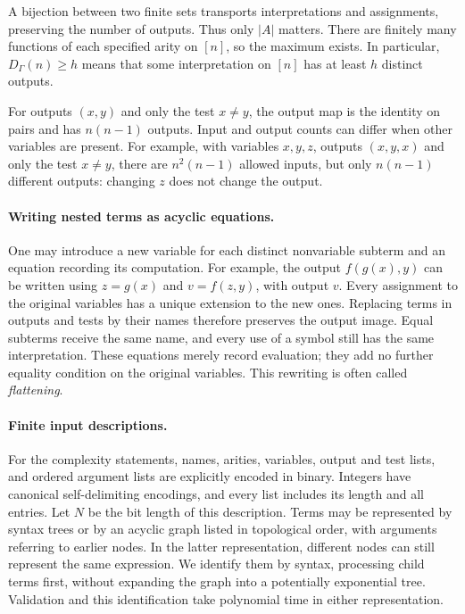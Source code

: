 \documentclass[12pt]{article}
\theoremstyle{definition}
\begin{document}
A bijection between two finite sets transports interpretations and
assignments, preserving the number of outputs. Thus only $|A|$ matters.
There are finitely many functions of each specified arity on $[n]$,
so the maximum exists. In particular, $D_\Gamma(n)\ge h$ means that
some interpretation on $[n]$ has at least $h$ distinct outputs.

For outputs $(x,y)$ and only the test $x\ne y$, the output map is the
identity on pairs and has $n(n-1)$ outputs. Input and output counts can
differ when other variables are present. For example, with variables
$x,y,z$, outputs $(x,y,x)$ and only the test $x\ne y$, there are
$n^2(n-1)$ allowed inputs, but only $n(n-1)$ different outputs:
changing $z$ does not change the output.

\paragraph{Writing nested terms as acyclic equations.}
One may introduce a new variable for each distinct nonvariable subterm
and an equation recording its computation. For example, the output
$f(g(x),y)$ can be written using $z=g(x)$ and $v=f(z,y)$, with output
$v$. Every assignment to the original variables has a unique extension
to the new ones. Replacing terms in outputs and tests by their names
therefore preserves the output image. Equal subterms receive the same
name, and every use of a symbol still has the same interpretation.
These equations merely record evaluation; they add no further equality
condition on the original variables. This rewriting is often called
\emph{flattening}.

\paragraph{Finite input descriptions.}
For the complexity statements, names, arities, variables, output and
test lists, and ordered argument lists are explicitly encoded in binary.
Integers have canonical self-delimiting encodings, and every list includes
its length and all entries. Let $N$ be the bit length of this description.
Terms may be represented by syntax trees or by an acyclic graph listed
in topological order, with arguments referring to earlier nodes.
In the latter representation, different nodes can still represent the
same expression. We identify them by syntax, processing child terms
first, without expanding the graph into a potentially exponential tree.
Validation and this identification take polynomial time in either
representation.
\end{document}
